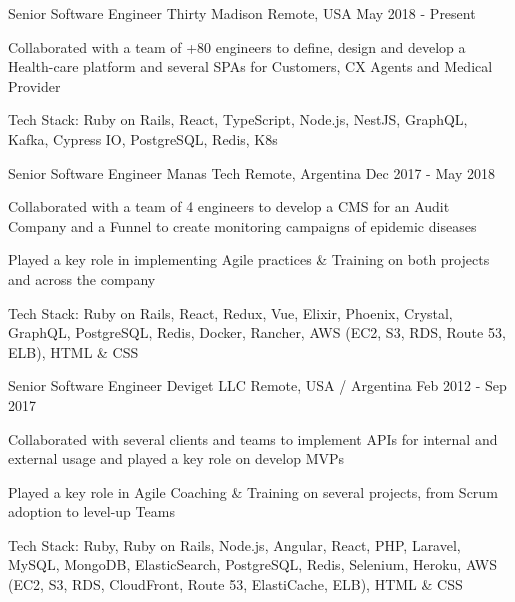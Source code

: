 
\begin{cventries}

  \cventry
    {Senior Software Engineer}
    {Thirty Madison}
    {Remote, USA}
    {May 2018 - Present}
    {
      \begin{cvitems}
        \item {Collaborated with a team of +80 engineers to define, design and develop a Health-care platform and several SPAs for Customers, CX Agents and Medical Provider}
        \item {Tech Stack: Ruby on Rails, React, TypeScript, Node.js, NestJS, GraphQL, Kafka, Cypress IO, PostgreSQL, Redis, K8s}
      \end{cvitems}
    }

  \cventry
    {Senior Software Engineer}
    {Manas Tech}
    {Remote, Argentina}
    {Dec 2017 - May 2018}
    {
      \begin{cvitems}
        \item {Collaborated with a team of 4 engineers to develop a CMS for an Audit Company and a Funnel to create monitoring campaigns of epidemic diseases}
        \item {Played a key role in implementing Agile practices \& Training on both projects and across the company}
        \item {Tech Stack: Ruby on Rails, React, Redux, Vue, Elixir, Phoenix, Crystal, GraphQL, PostgreSQL, Redis, Docker, Rancher, AWS (EC2, S3, RDS, Route 53, ELB), HTML \& CSS}
      \end{cvitems}
    }

  \cventry
    {Senior Software Engineer}
    {Deviget LLC}
    {Remote, USA / Argentina}
    {Feb 2012 - Sep 2017}
    {
      \begin{cvitems}
        \item {Collaborated with several clients and teams to implement APIs for internal and external usage and played a key role on develop MVPs}
        \item {Played a key role in Agile Coaching \& Training on several projects, from Scrum adoption to level-up Teams}
        \item {Tech Stack: Ruby, Ruby on Rails, Node.js, Angular, React, PHP, Laravel, MySQL, MongoDB, ElasticSearch, PostgreSQL, Redis, Selenium, Heroku, AWS (EC2, S3, RDS, CloudFront, Route 53, ElastiCache, ELB), HTML \& CSS}
      \end{cvitems}
    }


\end{cventries}
